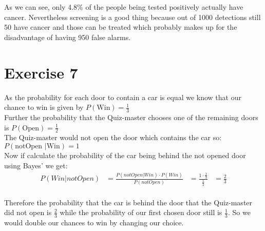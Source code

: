 \documentclass{article}
\begin{document}
As we can see, only 4.8\% of the people being tested positively actually have cancer. Nevertheless screening is a good thing because out of 1000 detections still 50 have cancer and those can be treated which probably makes up for the disadvantage of having 950 false alarms.  

\setcounter{equation}{0}
\section*{Exercise 7}

As the probability for each door to contain a car is equal we know that our chance to win is given by $P(\mbox{Win}) = \frac{1} 3$\\
Further the probability that the Quiz-master chooses one of the remaining doors is
$P(\mbox{Open}) = \frac{1} 2$\\
The Quiz-master would not open the door which contains the car so: \\
$P(\mbox{notOpen }|\mbox{Win}) = 1$\\
Now if calculate the probability of the car being behind the not opened door using Bayes' we get:
\begin{align}
& & P(Win|notOpen) & = \frac{P(notOpen|Win) \cdot P(Win)}{P(notOpen)} & = \frac{1 \cdot \frac{1}{3}}{\frac{1}{2}} &= \frac{2}{3}& &
\end{align}
\\
Therefore the probability that the car is behind the door that the Quiz-master did not open is $\frac{2}{3}$ while the probability of our first chosen door still is $\frac{1}{3}$. So we would double our chances to win by changing our choice.
\end{document}
